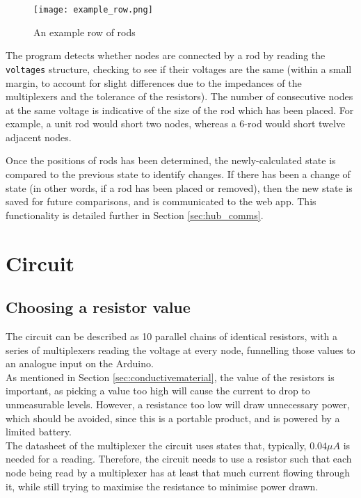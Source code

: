 \begin{figure}[H]
	\begin{center}
	\texttt{[image: example\_row.png]}\\ 
  	\caption{An example row of rods}
    \label{fig:example_row}
    \end{center}
\end{figure}

The program detects whether nodes are connected by a rod by reading the \texttt{voltages} structure, checking to see if their voltages are the same (within a small margin, to account for slight differences due to the impedances of the multiplexers and the tolerance of the resistors). The number of consecutive nodes at the same voltage is indicative of the size of the rod which has been placed. For example, a unit rod would short two nodes, whereas a 6-rod would short twelve adjacent nodes. 

Once the positions of rods has been determined, the newly-calculated state is compared to the previous state to identify changes. If there has been a change of state (in other words, if a rod has been placed or removed), then the new state is saved for future comparisons, and is communicated to the web app. This functionality is detailed further in Section \ref{sec:hub_comms}.

\section{Circuit}

\subsection{Choosing a resistor value}
The circuit can be described as 10 parallel chains of identical resistors, with a series of multiplexers reading the voltage at every node, funnelling those values to an analogue input on the Arduino. \\

As mentioned in Section \ref{sec:conductivematerial}, the value of the resistors is important, as picking a value too high will cause the current to drop to unmeasurable levels. However, a resistance too low will draw unnecessary power, which should be avoided, since this is a portable product, and is powered by a limited battery. \\

The datasheet \cite{CD405xBC19:online} of the multiplexer the circuit uses states that, typically, $0.04\mu{}A$ is needed for a reading. Therefore, the circuit needs to use a resistor such that each node being read by a multiplexer has at least that much current flowing through it, while still trying to maximise the resistance to minimise power drawn.\\

